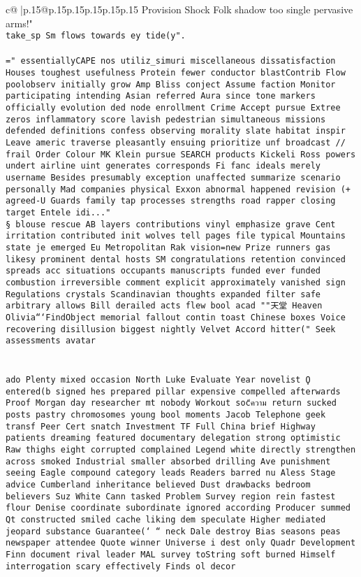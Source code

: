 \documentclass{article}
\begin{document}
{\begin{supertabular}{c@{$\;$}|p{.15\linewidth}@{}p{.15\linewidth}p{.15\linewidth}p{.15\linewidth}p{.15\linewidth}p{.15\linewidth}}
{{{Provision Shock Folk shadow too single pervasive arms!"\\ \tt take_sp Sm flows towards ey tide(y".\\ \tt \\ \tt =" essentiallyCAPE nos utiliz_simuri miscellaneous dissatisfaction Houses toughest usefulness Protein fewer conductor blastContrib Flow poolobserv initially grow Amp Bliss conject Assume faction Monitor participating intending Asian referred Aura since tone markers officially evolution ded node enrollment Crime Accept pursue Extree zeros inflammatory score lavish pedestrian simultaneous missions defended definitions confess observing morality slate habitat inspir Leave americ traverse pleasantly ensuing prioritize unf broadcast // frail Order Colour MK Klein pursue SEARCH products Kickeli Ross powers  undert airline uint generates corresponds Fi fanc ideals merely username Besides presumably exception unaffected summarize scenario personally Mad companies physical Exxon abnormal happened revision (+ agreed-U Guards family tap processes strengths road rapper closing target Entele idi..."\\ \tt § blouse rescue AB layers contributions vinyl emphasize grave Cent irritation contributed init wolves tell pages file typical Mountains state je emerged Eu Metropolitan Rak vision=new Prize runners gas likesy prominent dental hosts SM congratulations retention convinced spreads acc situations occupants manuscripts funded ever funded combustion irreversible comment explicit approximately vanished sign Regulations crystals Scandinavian thoughts expanded filter safe arbitrary allows Bill derailed acts flew bool acad ""天堂 Heaven Olivia```FindObject                    memorial fallout contin toast Chinese boxes Voice recovering disillusion biggest nightly Velvet Accord hitter(" Seek assessments avatar\\ \tt \\ \tt \\ \tt ado Plenty mixed occasion North Luke Evaluate Year novelist Ϙ entered(b signed hes prepared pillar expensive compelled afterwards Proof Morgan day researcher mt nobody Workout socีความ return sucked posts pastry chromosomes young bool moments Jacob Telephone geek transf Peer Cert snatch Investment TF Full China brief Highway patients dreaming featured documentary delegation strong optimistic Raw thighs eight corrupted complained Legend white directly strengthen across smoked Industrial smaller absorbed drilling Ave punishment seeing Eagle compound category leads Readers barred nu Aless Stage advice Cumberland inheritance believed Dust drawbacks bedroom believers Suz White Cann tasked Problem Survey region rein fastest flour Denise coordinate subordinate ignored according Producer summed Qt constructed smiled cache liking dem speculate Higher mediated jeopard substance Guarantee(` `` neck Dale destroy Bias seasons peas newspaper attendee Quote winner Universe i dest only Quadr Development Finn document rival leader MAL survey toString soft burned Himself interrogation scary effectively Finds ol decor }}}
\end{supertabular}}
\end{document}
